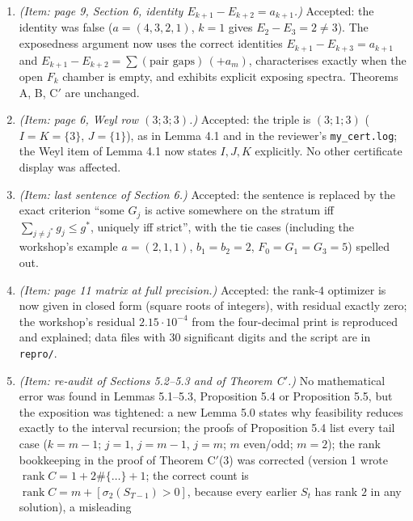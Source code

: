 \documentclass[
  11pt,
  a4paper,
]{article}
\providecommand{\tightlist}{%
  \setlength{\itemsep}{0pt}\setlength{\parskip}{0pt}}
\begin{document}
\begin{enumerate}
\def\labelenumi{\arabic{enumi}.}
\tightlist
\item
  \emph{(Item: page 9, Section 6, identity
  \(E_{k+1}-E_{k+2}=a_{k+1}\).)} Accepted: the identity was false
  (\(a=(4,\allowbreak{}3,\allowbreak{}2,\allowbreak{}1)\), \(k=1\) gives \(E_2-E_3=2\ne3\)). The exposedness
  argument now uses the correct identities \(E_{k+1}-E_{k+3}=a_{k+1}\)
  and \(E_{k+1}-E_{k+2}=\sum(\text{pair gaps})\,\allowbreak{}(+a_m)\), characterises
  exactly when the open \(F_k\) chamber is empty, and exhibits explicit
  exposing spectra. Theorems A, B, C\('\) are unchanged.
\item
  \emph{(Item: page 6, Weyl row \((3;\allowbreak{}3;\allowbreak{}3)\).)} Accepted: the triple is
  \((3;\allowbreak{}1;\allowbreak{}3)\) (\(I=K=\{3\}\), \(J=\{1\}\)), as in Lemma 4.1 and in the
  reviewer's {\small\texttt{my\_\allowbreak{}cert.\allowbreak{}log}}; the Weyl item of Lemma 4.1 now
  states \(I,\allowbreak{}J,\allowbreak{}K\) explicitly. No other certificate display was
  affected.
\item
  \emph{(Item: last sentence of Section 6.)} Accepted: the sentence is
  replaced by the exact criterion ``some \(G_j\) is active somewhere on
  the stratum iff \(\sum_{j\ne j^*}g_j\le g^*\), uniquely iff strict'',
  with the tie cases (including the workshop's example \(a=(2,\allowbreak{}1,\allowbreak{}1)\),
  \(b_1=b_2=2\), \(F_0=G_1=G_3=5\)) spelled out.
\item
  \emph{(Item: page 11 matrix at full precision.)} Accepted: the
  rank-\(4\) optimizer is now given in closed form (square roots of
  integers), with residual exactly zero; the workshop's residual
  \(2.15\cdot10^{-4}\) from the four-decimal print is reproduced and
  explained; data files with 30 significant digits and the script are in
  {\small\texttt{repro/\allowbreak{}}}.
\item
  \emph{(Item: re-audit of Sections 5.2--5.3 and of Theorem C\('\).)} No
  mathematical error was found in Lemmas 5.1--5.3, Proposition 5.4 or
  Proposition 5.5, but the exposition was tightened: a new Lemma 5.0
  states why feasibility reduces exactly to the interval recursion; the
  proofs of Proposition 5.4 list every tail case (\(k=m-1\); \(j=1\),
  \(j=m-1\), \(j=m\); \(m\) even/odd; \(m=2\)); the rank bookkeeping in
  the proof of Theorem C\('\)(3) was corrected (version 1 wrote
  \(\operatorname{rank}C=1+2\#\{\dots\}+1\); the correct count is
  \(\operatorname{rank}C=m+[\sigma_2(S_{T-1})>0]\), because every
  earlier \(S_t\) has rank \(2\) in any solution), a misleading

\end{enumerate}
\end{document}
